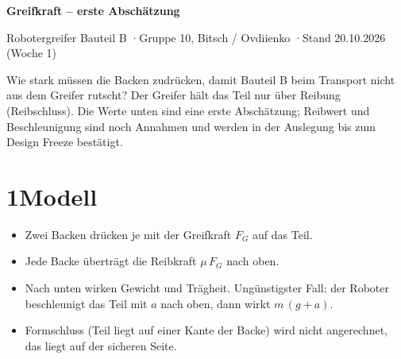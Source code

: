 \documentclass[11pt,a4paper]{article}
\begin{document}
{\Large\bfseries Greifkraft -- erste Abschätzung}\par
\vspace{-0.3em}
{\color{grau}Robotergreifer Bauteil B \quad·\quad Gruppe 10, Bitsch / Ovdiienko \quad·\quad Stand 20.10.2026 (Woche 1)}

\vspace{0.4em}
Wie stark müssen die Backen zudrücken, damit Bauteil B beim Transport nicht aus dem Greifer rutscht?
Der Greifer hält das Teil nur über Reibung (Reibschluss). Die Werte unten sind eine erste Abschätzung;
Reibwert und Beschleunigung sind noch Annahmen und werden in der Auslegung bis zum Design Freeze bestätigt.

\section*{1\quad Modell}

\begin{minipage}[c]{0.46\textwidth}
\centering
{}
\end{minipage}\hfill
\begin{minipage}[c]{0.5\textwidth}
\begin{itemize}\setlength{\itemsep}{0.2em}
  \item Zwei Backen drücken je mit der Greifkraft $F_G$ auf das Teil.
  \item Jede Backe überträgt die Reibkraft $\mu\,F_G$ nach oben.
  \item Nach unten wirken Gewicht und Trägheit. Ungünstigster Fall:
        der Roboter beschleunigt das Teil mit $a$ nach oben, dann wirkt
        $m\,(g+a)$.
  \item Formschluss (Teil liegt auf einer Kante der Backe) wird nicht
        angerechnet, das liegt auf der sicheren Seite.
\end{itemize}
\end{minipage}
\end{document}
